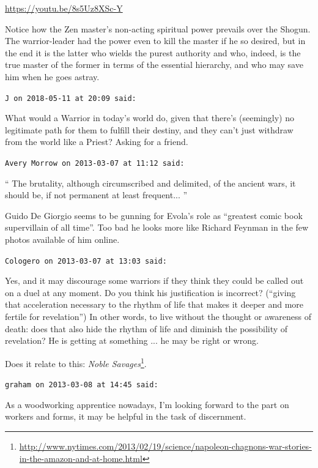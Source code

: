 \begin{footnotesize}
\begin{sffamily}
\url{https://youtu.be/8s5Uz8XSc-Y}


Notice how the Zen master's non-acting spiritual power prevails over the Shogun. The warrior-leader had the power even to kill the master if he so desired, but in the end it is the latter who wields the purest authority and who, indeed, is the true master of the former in terms of the essential hierarchy, and who may save him when he goes astray.

\hfill

\texttt{J on 2018-05-11 at 20:09 said:}

What would a Warrior in today's world do, given that there's (seemingly) no legitimate path for them to fulfill their destiny, and they can't just withdraw from the world like a Priest? Asking for a friend.

\hfill

\texttt{Avery Morrow on 2013-03-07 at 11:12 said:}

`` The brutality, although circumscribed and delimited, of the ancient wars, it should be, if not permanent at least frequent... ''

Guido De Giorgio seems to be gunning for Evola's role as ``greatest comic book supervillain of all time''. Too bad he looks more like Richard Feynman in the few photos available of him online.

\hfill

\texttt{Cologero on 2013-03-07 at 13:03 said:}

Yes, and it may discourage some warriors if they think they could be called out on a duel at any moment. Do you think his justification is incorrect? (``giving that acceleration necessary to the rhythm of life that makes it deeper and more fertile for revelation'') In other words, to live without the thought or awareness of death: does that also hide the rhythm of life and diminish the possibility of revelation? He is getting at something ... he may be right or wrong.

Does it relate to this:
\textit{Noble Savages}\footnote{\url{http://www.nytimes.com/2013/02/19/science/napoleon-chagnons-war-stories-in-the-amazon-and-at-home.html}}.

\hfill

\texttt{graham on 2013-03-08 at 14:45 said:}

As a woodworking apprentice nowadays, I'm looking forward to the part on workers and forms, it may be helpful in the task of discernment.

\hfill


\end{sffamily}
\end{footnotesize}
